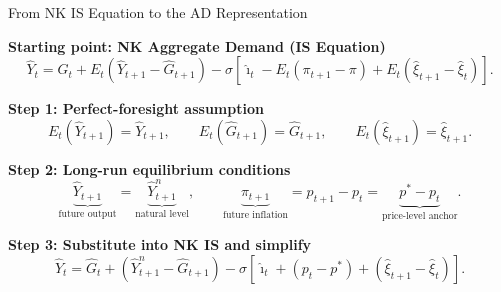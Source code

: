 \documentclass[11pt,aspectratio=169]{beamer}
\begin{document}
\begin{frame}{From NK IS Equation to the AD Representation}
\small

\textbf{Starting point: NK Aggregate Demand (IS Equation)}
\[
\hat{Y}_t =
\hat{G}_t +
E_t(\hat{Y}_{t+1}-\hat{G}_{t+1})
-
\sigma\!\left[
\hat{\imath}_t - E_t(\pi_{t+1}-\pi)
+ E_t(\hat{\xi}_{t+1}-\hat{\xi}_t)
\right].
\]

\vspace{0.25cm}

\textbf{Step 1: Perfect-foresight assumption}
\[
E_t(\hat{Y}_{t+1}) = \hat{Y}_{t+1}, 
\qquad 
E_t(\hat{G}_{t+1}) = \hat{G}_{t+1},
\qquad
E_t(\hat{\xi}_{t+1}) = \hat{\xi}_{t+1}.
\]

\vspace{0.25cm}

\textbf{Step 2: Long-run equilibrium conditions}
\[
\underbrace{\hat{Y}_{t+1}}_{\text{future output}}
=
\underbrace{\hat{Y}_{t+1}^{n}}_{\text{natural level}},
\qquad
\underbrace{\pi_{t+1}}_{\text{future inflation}}
=
p_{t+1}-p_t
=
\underbrace{p^{\ast} - p_t}_{\text{price-level anchor}}.
\]

\vspace{0.25cm}

\textbf{Step 3: Substitute into NK IS and simplify}
\[
\hat{Y}_t
=
\hat{G}_t
+
(\hat{Y}_{t+1}^{n} - \hat{G}_{t+1})
-
\sigma\!
\left[
\hat{\imath}_t 
+ 
(p_t - p^{\ast})
+
(\hat{\xi}_{t+1}-\hat{\xi}_t)
\right].
\]

\end{frame}
\end{document}
